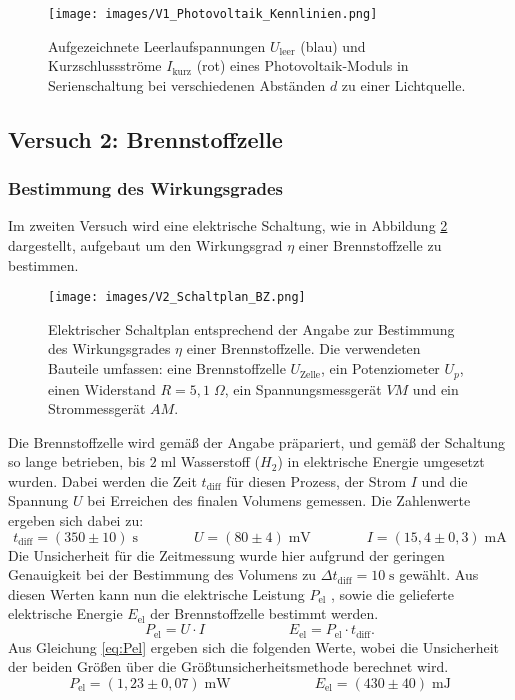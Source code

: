 \documentclass{article}
\begin{document}
\begin{figure}[H]
    \centering
    \texttt{[image: images/V1\_Photovoltaik\_Kennlinien.png]}
    \caption{Aufgezeichnete Leerlaufspannungen $U_\text{leer}$ (blau) und Kurzschlussströme $I_\text{kurz}$ (rot) eines Photovoltaik-Moduls in Serienschaltung bei verschiedenen Abständen $d$ zu einer Lichtquelle.}
    \label{fig:V1_PV_Kennlinien}
\end{figure}

\subsection{Versuch 2: Brennstoffzelle}
\subsubsection{Bestimmung des Wirkungsgrades}
\noindent Im zweiten Versuch wird eine elektrische Schaltung, wie in Abbildung \ref{fig:V2_BZ_Schaltplan} dargestellt, aufgebaut um den Wirkungsgrad $\eta$ einer Brennstoffzelle zu bestimmen.

\begin{figure}[h!]
    \centering
    \texttt{[image: images/V2\_Schaltplan\_BZ.png]}
    \caption{Elektrischer Schaltplan entsprechend der Angabe \cite{Angabe} zur Bestimmung des Wirkungsgrades $\eta$ einer Brennstoffzelle. Die verwendeten Bauteile umfassen: eine Brennstoffzelle $U_\text{Zelle}$, ein Potenziometer $U_p$, einen Widerstand $R=5{,}1 \; \Omega$, ein Spannungsmessgerät $VM$ und ein Strommessgerät $AM$.}
    \label{fig:V2_BZ_Schaltplan}
\end{figure}

\noindent Die Brennstoffzelle wird gemäß der Angabe \cite{Angabe} präpariert, und gemäß der Schaltung so lange betrieben, bis $2 \; \text{ml}$ Wasserstoff ($H_2$) in elektrische Energie umgesetzt wurden. Dabei werden die Zeit $t_\text{diff}$ für diesen Prozess, der Strom $I$ und die Spannung $U$ bei Erreichen des finalen Volumens gemessen. Die Zahlenwerte ergeben sich dabei zu:
$$t_\text{diff} = (350 \pm 10) \; \text{s} \qquad \qquad U = (80 \pm 4) \; \text{mV} \qquad \qquad I = (15{,}4 \pm 0{,}3) \; \text{mA}$$
Die Unsicherheit für die Zeitmessung wurde hier aufgrund der geringen Genauigkeit bei der Bestimmung des Volumens zu $\Delta t_\text{diff} = 10 \; \text{s}$ gewählt. Aus diesen Werten kann nun die elektrische Leistung $P_\text{el}$ , sowie die gelieferte elektrische Energie $E_\text{el}$ der Brennstoffzelle bestimmt werden.
\begin{equation}\label{eq:Pel}
    P_\text{el} = U\cdot I\qquad \qquad\qquad E_\text{el} = P_\text{el}\cdot t_\text{diff}.
\end{equation}
Aus Gleichung \ref{eq:Pel} ergeben sich die folgenden Werte, wobei die Unsicherheit der beiden Größen über die Größtunsicherheitsmethode berechnet wird.
$$P_\text{el} = (1{,}23 \pm 0{,}07) \; \text{mW} \qquad \qquad \qquad E_\text{el} = (430 \pm 40)\; \text{mJ}$$
\end{document}
